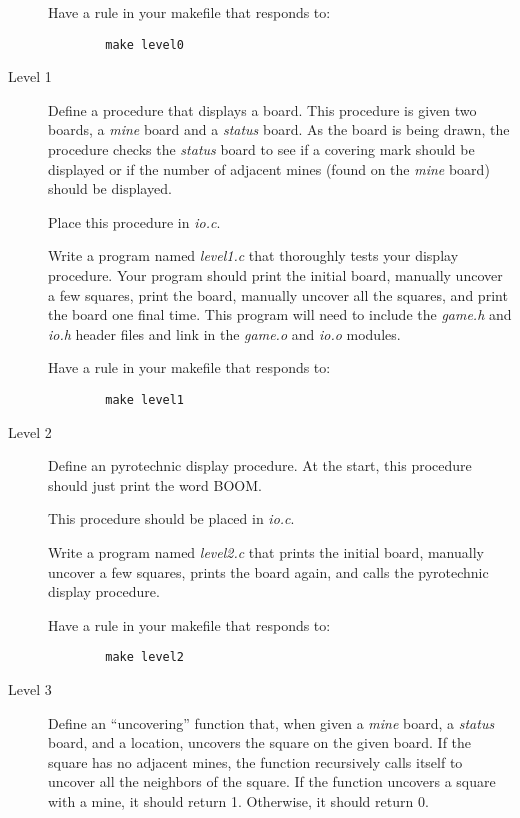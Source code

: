 \documentclass{article}
\begin{document}
\begin{description}
    Have a rule in your makefile that responds to:

\begin{verbatim}
        make level0
\end{verbatim}

\item[Level 1]
    Define a procedure that displays a board. This procedure is given two
    boards, a {\it mine} board and a {\it status} board.  As the board is
    being drawn, the procedure checks the {\it status} board to see if a
    covering mark should be displayed or if the number of adjacent mines
    (found on the {\it mine} board) should be displayed.

    Place this procedure in {\it io.c}.

    Write a program named {\it level1.c} that thoroughly tests your display
    procedure. Your program should print the initial board, manually uncover
    a few squares, print the board, manually uncover all the squares,
    and print the board one final time. This program will need to
    include the {\it game.h} and {\it io.h} header files and link in
    the {\it game.o} and {\it io.o} modules.

    Have a rule in your makefile that responds to:

\begin{verbatim}
        make level1
\end{verbatim}

\item[Level 2]
    Define an pyrotechnic display procedure. At the start, this procedure
    should just print the word BOOM.

    This procedure should be placed in {\it io.c}.

    Write a program named {\it level2.c} that 
    prints the initial board, manually uncover
    a few squares, prints the board again, and calls the
    pyrotechnic display procedure.

    Have a rule in your makefile that responds to:

\begin{verbatim}
        make level2
\end{verbatim}

\item[Level 3]
    Define an ``uncovering'' function that, when given a {\it mine}
    board, a {\it status} board, and a location, uncovers the square on
    the given board. If the square has no adjacent mines, the function
    recursively calls itself to uncover all the neighbors of the square.
    If the function uncovers a square with a mine, it should return
    1. Otherwise, it should return 0.


\end{description}
\end{document}
